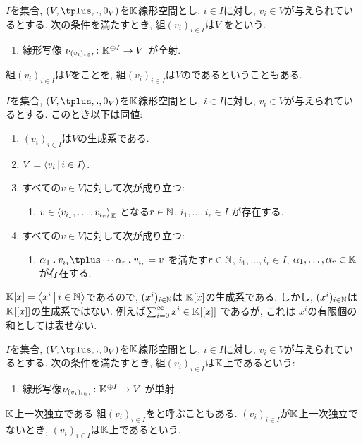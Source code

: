 \begin{definition}
  $I$を集合,
  $(V,\plus,\act,0_V)$を$\mathbb{K}$線形空間とし,
  $i\in I$に対し, $v_i\in V$が与えられているとする.
  次の条件を満たすとき,
  組$(v_i)_{i\in I}$は$V$
  をという.
  \begin{enumerate}
  \item
  線形写像 $\nu_{(v_i)_{i\in I}}\colon \mathbb{K}^{\oplus I} \to V$
    が全射.
  \end{enumerate}
  組$(v_i)_{i\in I}$は$V$をことを,
  組$(v_i)_{i\in I}$は$V$のであるということもある.
\end{definition}
\begin{prop}
  $I$を集合,
  $(V,\plus,\act,0_V)$を$\mathbb{K}$線形空間とし,
  $i\in I$に対し, $v_i\in V$が与えられているとする.
  このとき以下は同値:
  \begin{enumerate}
  \item $(v_i)_{i\in I}$は$V$の生成系である.
  \item $V=\Braket{v_i|i\in I}$.
  \item
    すべての$v\in V$に対して次が成り立つ:
    \begin{enumerate}
    \item
    $v\in \Braket{v_{i_1},\ldots,v_{i_r}}_{\mathbb{K}}$
    となる$r\in\mathbb{N}$, $i_1,\ldots,i_r\in I$ が存在する.
    \end{enumerate}
  \item
    すべての$v\in V$に対して次が成り立つ:
    \begin{enumerate}
    \item
    $\alpha_1\act v_{i_1}\plus \cdots \alpha_r\act v_{i_r}=v$
    を満たす$r\in\mathbb{N}$, $i_1,\ldots,i_r\in I$, $\alpha_1,\ldots,\alpha_r\in\mathbb{K}$ が存在する.
    \end{enumerate}
  \end{enumerate}
\end{prop}

\begin{example}
$\mathbb{K}[x]=\Braket{x^i|i\in \mathbb{N}}$であるので,
$(x^i)_{i\in \mathbb{N}}$は
$\mathbb{K}[x]$の生成系である.
しかし,
$(x^i)_{i\in \mathbb{N}}$は
$\mathbb{K}[[x]]$の生成系ではない.
例えば$\sum_{i=0}^{\infty}x^i\in \mathbb{K}[[x]]$
であるが,
これは
$x^i$の有限個の和としては表せない.
\end{example}


\begin{definition}
  $I$を集合,
  $(V,\plus,\act,0_V)$を$\mathbb{K}$線形空間とし,
  $i\in I$に対し, $v_i\in V$が与えられているとする.
  次の条件を満たすとき,
  組$(v_i)_{i\in I}$は$\mathbb{K}$上であるという:
\begin{enumerate}
  \item 線形写像$\nu_{(v_i)_{i\in I}}\colon \mathbb{K}^{\oplus I}\to V$
    が単射.
  \end{enumerate}
  $\mathbb{K}$上一次独立である
  組$(v_i)_{i\in I}$をと呼ぶこともある.
  $(v_i)_{i\in I}$が$\mathbb{K}$上一次独立でないとき,
  $(v_i)_{i\in I}$は$\mathbb{K}$上であるという.
\end{definition}

